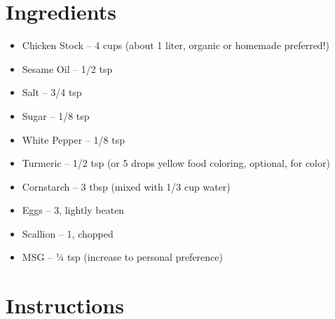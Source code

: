 




\section*{Ingredients}

\begin{itemize}
      \item Chicken Stock – 4 cups (about 1 liter, organic or homemade preferred!)
      \item[\measure] Sesame Oil – 1/2 tsp
      \item[\measure] Salt – 3/4 tsp
      \item[\measure] Sugar – 1/8 tsp
      \item[\measure] White Pepper – 1/8 tsp
      \item[\measure] Turmeric – 1/2 tsp (or 5 drops yellow food coloring, optional, for color)
      \item[\measure] Cornstarch – 3 tbsp (mixed with 1/3 cup water)
      \item Eggs – 3, lightly beaten
      \item[\cut] Scallion – 1, chopped
      \item[\measure] MSG – ¼ tsp (increase to personal preference)
\end{itemize}

\newpage
{}
\section*{Instructions}

